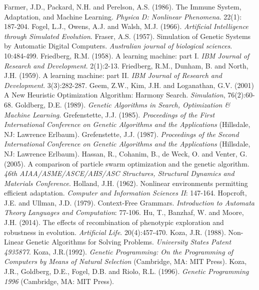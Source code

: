 \documentclass[spanish,a4paper,12pt,twoside]{report}
\begin{document}
\begin{thebibliography}{00}
   Farmer, J.D., Packard, N.H. and Perelson, A.S. (1986). The Immune System, Adaptation, and Machine Learning. \emph{Physica D: Nonlinear Phenomena}. 22(1): 187-204.
   Fogel, L.J., Owens, A.J. and Walsh, M.J. (1966). \emph{Artificial Intelligence through Simulated Evolution}.
   Fraser, A.S. (1957). Simulation of Genetic Systems by Automatic Digital Computers. \emph{Australian journal of biological sciences}. 10:484-499.
   Friedberg, R.M. (1958). A learning machine: part I. \emph{IBM Journal of Research and Development}. 2(1):2-13.
   Friedberg, R.M., Dunham, B. and North, J.H. (1959). A learning machine: part II. \emph{IBM Journal of Research and Development}. 3(3):282-287.
   Geem, Z.W., Kim, J.H. and Loganathan, G.V. (2001) A New Heuristic Optimization Algorithm: Harmony Search. \emph{Simulation}, 76(2):60-68.
   Goldberg, D.E. (1989). \emph{Genetic Algorithms in Search, Optimization \& Machine Learning}.
   Grefenstette, J.J. (1985). \emph{Proceedings of the First International Conference on Genetic Algorithms and the Applications} (Hillsdale, NJ: Lawrence Erlbaum).
   Grefenstette, J.J. (1987). \emph{Proceedings of the Second International Conference on Genetic Algorithms and the Applications} (Hillsdale, NJ: Lawrence Erlbaum).
   Hassan, R., Cohanim, B., de Weck, O. and Venter, G. (2005). A comparison of particle swarm optimization and the genetic algorithm. \emph{46th AIAA/ASME/ASCE/AHS/ASC Structures, Structural Dynamics and Materials Conference}.
   Holland, J.H. (1962). Nonlinear environments permitting efficient adaptation. \emph{Computer and Information Sciences II}: 147-164.
   Hopcroft, J.E. and Ullman, J.D. (1979). Context-Free Grammars. \emph{Introduction to Automata Theory Languages and Computation}: 77-106.
   Hu, T., Banzhaf, W. and Moore, J.H. (2014). The effects of recombination of phenotypic exploration and robustness in evolution. \emph{Artificial Life}. 20(4):457-470.
   Koza, J.R. (1988). Non-Linear Genetic Algorithms for Solving Problems. \emph{University States Patent 4935877}.
   Koza, J.R.(1992). \emph{Genetic Programming: On the Programming of Computers by Means of Natural Selection}  (Cambridge, MA: MIT Press).
   Koza, J.R., Goldberg, D.E., Fogel, D.B. and Riolo, R.L. (1996). \emph{Genetic Programming 1996} (Cambridge, MA: MIT Press).

\end{thebibliography}
\end{document}
